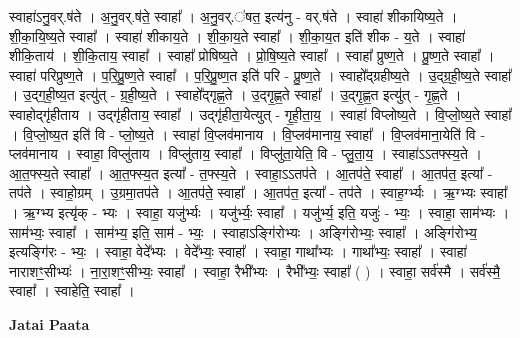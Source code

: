 \documentclass[17pt]{extarticle}
\begin{document}
स्वाहा॑ऽनु॒वर्.ष॑ते । अ॒नु॒वर्.ष॑ते॒ स्वाहा᳚ । अ॒नु॒वर्.॑षत॒ इत्य॑नु - वर्.ष॑ते । स्वाहा॑ शीकायिष्य॒ते । शी॒का॒यि॒ष्य॒ते स्वाहा᳚ । स्वाहा॑ शीकाय॒ते । शी॒का॒य॒ते स्वाहा᳚ । शी॒का॒य॒त इति॑ शीक - य॒ते । स्वाहा॑ शीकि॒ताय॑ । शी॒कि॒ताय॒ स्वाहा᳚ । स्वाहा᳚ प्रोषिष्य॒ते । प्रो॒षि॒ष्य॒ते स्वाहा᳚ । स्वाहा᳚ प्रुष्ण॒ते । प्रु॒ष्ण॒ते स्वाहा᳚ । स्वाहा॑ परिप्रुष्ण॒ते । प॒रि॒प्रु॒ष्ण॒ते स्वाहा᳚ । प॒रि॒प्रु॒ष्ण॒त इति॑ परि - प्रु॒ष्ण॒ते । स्वाहो᳚द्ग्रहीष्य॒ते । उ॒द्ग्र॒ही॒ष्य॒ते स्वाहा᳚ । उ॒द्‍ग॒ही॒ष्य॒त इत्यु॑त् - ग्र॒ही॒ष्य॒ते । स्वाहो᳚द्‍गृह्ण॒ते । उ॒द्‍गृ॒ह्ण॒ते स्वाहा᳚ । उ॒द्‍गृ॒ह्ण॒त इत्यु॑त् - गृ॒ह्ण॒ते । स्वाहोद्‍गृ॑हीताय । उद्‍गृ॑हीताय॒ स्वाहा᳚ । उद्‍गृ॑हीता॒येत्युत् - गृ॒ही॒ता॒य॒ । स्वाहा॑ विप्लोष्य॒ते । वि॒प्लो॒ष्य॒ते स्वाहा᳚ । वि॒प्लो॒ष्य॒त इति॑ वि - प्लो॒ष्य॒ते । स्वाहा॑ वि॒प्लव॑मानाय । वि॒प्लव॑मानाय॒ स्वाहा᳚ । वि॒प्लव॑माना॒येति॑ वि - प्लव॑मानाय । स्वाहा॒ विप्लु॑ताय । विप्लु॑ताय॒ स्वाहा᳚ । विप्लु॑ता॒येति॒ वि - प्लु॒ता॒य॒ । स्वाहा॑ऽऽतफ्स्य॒ते । आ॒त॒फ्स्य॒ते स्वाहा᳚ । आ॒त॒फ्स्य॒त इत्या᳚ - त॒फ्स्य॒ते । स्वाहा॒ऽऽतप॑ते । आ॒तप॑ते॒ स्वाहा᳚ । आ॒तप॑त॒ इत्या᳚ - तप॑ते । स्वाहो॒ग्रम् । उ॒ग्रमा॒तप॑ते । आ॒तप॑ते॒ स्वाहा᳚ । आ॒तप॑त॒ इत्या᳚ - तप॑ते । स्वाह॒र्ग्भ्यः । ऋ॒ग्भ्यः स्वाहा᳚ । ऋ॒ग्भ्य इत्यृ॑क् - भ्यः । स्वाहा॒ यजु॑र्भ्यः । यजु॑र्भ्यः॒ स्वाहा᳚ । यजु॑र्भ्य॒ इति॒ यजुः॑ - भ्यः॒ । स्वाहा॒ साम॑भ्यः । साम॑भ्यः॒ स्वाहा᳚ । साम॑भ्य॒ इति॒ साम॑ - भ्यः॒ । स्वाहाऽङ्‍गि॑रोभ्यः । अङ्‍गि॑रोभ्यः॒ स्वाहा᳚ । अङ्‍गि॑रोभ्य॒ इत्यङ्‍गि॑रः - भ्यः॒ । स्वाहा॒ वेदे᳚भ्यः । वेदे᳚भ्यः॒ स्वाहा᳚ । स्वाहा॒ गाथा᳚भ्यः । गाथा᳚भ्यः॒ स्वाहा᳚ । स्वाहा॑ नाराशꣳ॒॒सीभ्यः॑ । ना॒रा॒शꣳ॒॒सीभ्यः॒ स्वाहा᳚ । स्वाहा॒ रैभी᳚भ्यः । रैभी᳚भ्यः॒ स्वाहा᳚ ( ) । स्वाहा॒ सर्व॑स्मै । सर्व॑स्मै॒ स्वाहा᳚ । स्वाहेति॒ स्वाहा᳚ । \newline

\textbf{Jatai Paata} \newline
\end{document}
